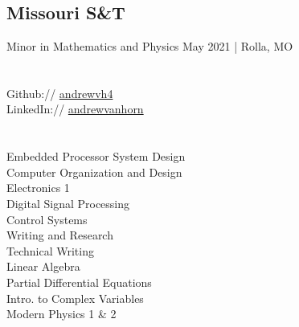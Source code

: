 \documentclass[]{deedy-resume-andrewvanhorn}
\begin{document}
%
%
\lastupdated

%
%



%
%

\begin{minipage}[t]{0.33\textwidth} 
\sectionsep
\sectionsep

\section{} 

\subsection{Missouri S\&T}
Minor in Mathematics and Physics
May 2021 | Rolla, MO\\
\sectionsep


\section{} 
Github:// \href{https://github.com/andrewvh4}{andrewvh4} \\
LinkedIn:// \href{https://www.linkedin.com/in/andrewvanhorn/}{andrewvanhorn} \\
\sectionsep


\section{}
Embedded Processor System Design\\
Computer Organization and Design\\
Electronics 1\\
Digital Signal Processing\\
Control Systems\\
Writing and Research\\
Technical Writing\\
Linear Algebra\\
Partial Differential Equations\\
Intro. to Complex Variables\\
Modern Physics 1 \& 2


\end{minipage}
\end{document}

